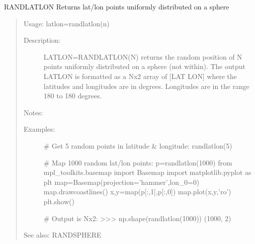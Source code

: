 \documentclass[letterpaper,10pt,english]{sphinxmanual}
\begin{document}

\begin{fulllineitems}
\label{\detokenize{infrapy.utils:infrapy.utils.latlon.randlatlon}}
RANDLATLON    Returns lat/lon points uniformly distributed on a sphere
\begin{quote}

Usage:    latlon=randlatlon(n)
\begin{description}
\item[{Description:}] \leavevmode
LATLON=RANDLATLON(N) returns the random position of N points uniformly
distributed on a sphere (not within).  The output LATLON is formatted
as a Nx2 array of {[}LAT LON{]} where the latitudes and longitudes are in
degrees.  Longitudes are in the range \sphinxhyphen{}180 to 180 degrees.

\end{description}

Notes:
\begin{description}
\item[{Examples:}] \leavevmode
\# Get 5 random points in latitude \& longitude:
randlatlon(5)

\# Map 1000 random lat/lon points:
p=randlatlon(1000)
from mpl\_toolkits.basemap import Basemap
import matplotlib.pyplot as plt
map=Basemap(projection=’hammer’,lon\_0=0)
map.drawcoastlines()
x,y=map(p{[}:,1{]},p{[}:,0{]})
map.plot(x,y,’ro’)
plt.show()

\# Output is Nx2:
\textgreater{}\textgreater{}\textgreater{} np.shape(randlatlon(1000))
(1000, 2)

\end{description}

See also: RANDSPHERE
\end{quote}

\end{fulllineitems}

\end{document}
